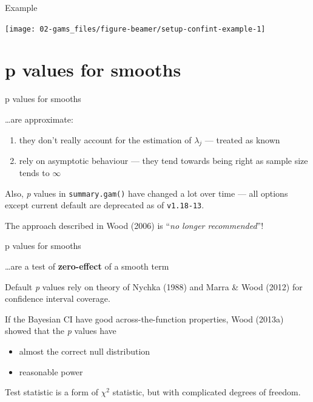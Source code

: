 \documentclass[10pt,ignorenonframetext,compress, aspectratio=169]{beamer}
\providecommand{\tightlist}{%
  \setlength{\itemsep}{0pt}\setlength{\parskip}{0pt}}
\begin{document}
\begin{frame}{Example}

\begin{center}\texttt{[image: 02-gams\_files/figure-beamer/setup-confint-example-1]} \end{center}

\end{frame}

\section{p values for smooths}\label{p-values-for-smooths}

\begin{frame}[fragile]{p values for smooths}

\ldots{}are approximate:

\begin{enumerate}
\def\labelenumi{\arabic{enumi}.}
\tightlist
\item
  they don't really account for the estimation of \(\lambda_j\) ---
  treated as known
\item
  rely on asymptotic behaviour --- they tend towards being right as
  sample size tends to \(\infty\)
\end{enumerate}

Also, \emph{p} values in \texttt{summary.gam()} have changed a lot over
time --- all options except current default are deprecated as of
\texttt{v1.18-13}.

The approach described in Wood (2006) is ``\emph{no longer
recommended}''!

\end{frame}

\begin{frame}{p values for smooths}

\ldots{}are a test of \textbf{zero-effect} of a smooth term

Default \emph{p} values rely on theory of Nychka (1988) and Marra \&
Wood (2012) for confidence interval coverage.

If the Bayesian CI have good across-the-function properties, Wood
(2013a) showed that the \emph{p} values have

\begin{itemize}
\tightlist
\item
  almost the correct null distribution
\item
  reasonable power
\end{itemize}

Test statistic is a form of \(\chi^2\) statistic, but with complicated
degrees of freedom.

\end{frame}
\end{document}
